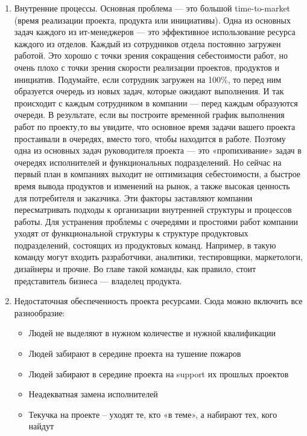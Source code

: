 \documentclass{../industrial-development}
\begin{document}
\begin{enumerate} 
\item Внутренние процессы. Основная проблема — это большой time-to-market (время реализации проекта, продукта или инициативы). Одна из основных задач каждого из ит-менеджеров — это эффективное использование ресурса каждого из отделов. Каждый из сотрудников отдела постоянно загружен работой. Это хорошо с точки зрения сокращения себестоимости работ, но очень плохо с точки зрения скорости реализации проектов, продуктов и инициатив. Подумайте, если сотрудник загружен на 100\%, то перед ним образуется очередь из новых задач, которые ожидают выполнения. И так происходит с каждым сотрудником в компании — перед каждым образуются очереди. В результате, если вы построите временной график выполнения работ по проекту,то вы увидите, что основное время задачи вашего проекта простаивали в очередях, вместо того, чтобы находится в работе. Поэтому одна из основных задач руководителя проекта — это «пропихивание» задач в очередях исполнителей и функциональных подразделений. 
Но сейчас на первый план в компаниях выходит не оптимизация себестоимости, а быстрое время вывода продуктов и изменений на рынок, а также высокая ценность для потребителя и заказчика. Эти факторы заставляют компании пересматривать подходы к организации внутренней структуры и процессов работы. Для устранения проблемы с очередями и простоями работ компании уходят от функциональной структуры к структуре продуктовых подразделений, состоящих из продуктовых команд. Например, в такую команду могут входить разработчики, аналитики, тестировщики, маркетологи, дизайнеры и прочие. Во главе такой команды, как правило, стоит представитель бизнеса — владелец продукта. 
\item Недостаточная обеспеченность проекта ресурсами. Сюда можно включить все разнообразие: 
\begin{itemize} 
\item Людей не выделяют в нужном количестве и нужной квалификации 
\item Людей забирают в середине проекта на тушение пожаров 
\item Людей забирают в середине проекта на support их прошлых проектов 
\item Неадекватная замена исполнителей 
\item Текучка на проекте – уходят те, кто «в теме», а набирают тех, кого найдут 
\end{itemize} 

\end{enumerate}
\end{document}
